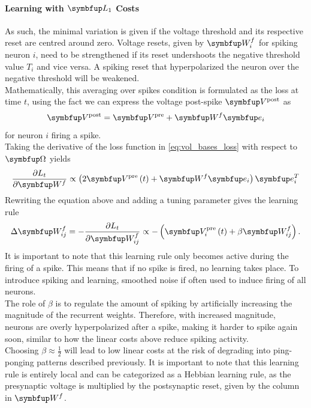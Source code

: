 \paragraph{Learning with $\bmu{L_1}$ Costs}
As such, the minimal variation is given if the voltage threshold and its respective reset are centred around zero. Voltage resets, given by $\bmu{W}^f_i$ for spiking neuron $i$, need to be strengthened if its reset undershoots the negative threshold value $T_i$ and vice versa. A spiking reset that hyperpolarized the neuron over the negative threshold will be weakened.\\
Mathematically, this averaging over spikes condition is formulated as the loss at time $t$, using the fact we can express the voltage post-spike $\bmu{V}^{\text {post}}$ as
\begin{equation}
	\bmu{V}^{\text {post}} = \bmu{V}^{\text {pre}} + \bmu{W}^f \bmu{e}_i
\end{equation}
for neuron $i$ firing a spike.\\
Taking the derivative of the loss function in \cref{eq:vol_bases_loss} with respect to $\bmu{\Omega}$ yields
\begin{equation}
\frac{\partial L_t}{\partial \bmu{W}^f} \propto\left(2 \bmu{V}^{\text {pre}}\left(t\right)+\bmu{W}^f \bmu{e}_{i}\right) \bmu{e}_{i}^{T}
\end{equation}
Rewriting the equation above and adding a tuning parameter gives the learning rule
\begin{equation}\label{eq:Wf_learning_rule_1}
	\Delta \bmu{W}^f_{ij} =-\frac{\partial L_t}{\partial \bmu{W}^f_{ij}} \propto - \left( \bmu{V}_i^{\text {pre}}\left(t\right)+\beta \bmu{W}^f_{ij}\right).
\end{equation}
It is important to note that this learning rule only becomes active during the firing of a spike. This means that if no spike is fired, no learning takes place. To introduce spiking and learning, smoothed noise if often used to induce firing of all neurons.\\
The role of $\beta$ is to regulate the amount of spiking by artificially increasing the magnitude of the recurrent weights. Therefore, with increased magnitude, neurons are overly hyperpolarized after a spike, making it harder to spike again soon, similar to how the linear costs above reduce spiking activity.\\
Choosing $\beta \approx \frac{1}{2}$ will lead to low linear costs at the risk of degrading into ping-ponging patterns described previously. It is important to note that this learning rule is entirely local and can be categorized as a Hebbian learning rule, as the presynaptic voltage is multiplied by the postsynaptic reset, given by the column in $\bmu{W}^f$.
